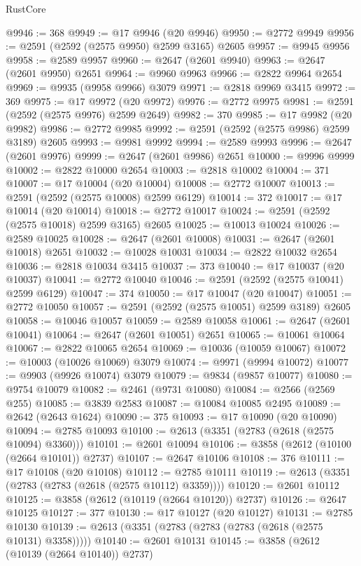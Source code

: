 \begin{lexlean}{RustCore}
\begin{coremodule}
@9946 := 368
@9949 := @17 @9946 (@20 @9946)
@9950 := @2772 @9949
@9956 := @2591 (@2592 (@2575 @9950) @2599 @3165) @2605
@9957 := @9945 @9956
@9958 := @2589 @9957
@9960 := @2647 (@2601 @9940)
@9963 := @2647 (@2601 @9950) @2651
@9964 := @9960 @9963
@9966 := @2822 @9964 @2654
@9969 := @9935 (@9958 @9966) @3079
@9971 := @2818 @9969 @3415
@9972 := 369
@9975 := @17 @9972 (@20 @9972)
@9976 := @2772 @9975
@9981 := @2591 (@2592 (@2575 @9976) @2599 @2649)
@9982 := 370
@9985 := @17 @9982 (@20 @9982)
@9986 := @2772 @9985
@9992 := @2591 (@2592 (@2575 @9986) @2599 @3189) @2605
@9993 := @9981 @9992
@9994 := @2589 @9993
@9996 := @2647 (@2601 @9976)
@9999 := @2647 (@2601 @9986) @2651
@10000 := @9996 @9999
@10002 := @2822 @10000 @2654
@10003 := @2818 @10002
@10004 := 371
@10007 := @17 @10004 (@20 @10004)
@10008 := @2772 @10007
@10013 := @2591 (@2592 (@2575 @10008) @2599 @6129)
@10014 := 372
@10017 := @17 @10014 (@20 @10014)
@10018 := @2772 @10017
@10024 := @2591 (@2592 (@2575 @10018) @2599 @3165) @2605
@10025 := @10013 @10024
@10026 := @2589 @10025
@10028 := @2647 (@2601 @10008)
@10031 := @2647 (@2601 @10018) @2651
@10032 := @10028 @10031
@10034 := @2822 @10032 @2654
@10036 := @2818 @10034 @3415
@10037 := 373
@10040 := @17 @10037 (@20 @10037)
@10041 := @2772 @10040
@10046 := @2591 (@2592 (@2575 @10041) @2599 @6129)
@10047 := 374
@10050 := @17 @10047 (@20 @10047)
@10051 := @2772 @10050
@10057 := @2591 (@2592 (@2575 @10051) @2599 @3189) @2605
@10058 := @10046 @10057
@10059 := @2589 @10058
@10061 := @2647 (@2601 @10041)
@10064 := @2647 (@2601 @10051) @2651
@10065 := @10061 @10064
@10067 := @2822 @10065 @2654
@10069 := @10036 (@10059 @10067)
@10072 := @10003 (@10026 @10069) @3079
@10074 := @9971 (@9994 @10072)
@10077 := @9903 (@9926 @10074) @3079
@10079 := @9834 (@9857 @10077)
@10080 := @9754 @10079
@10082 := @2461 (@9731 @10080)
@10084 := @2566 (@2569 @255)
@10085 := @3839 @2583
@10087 := @10084 @10085 @2495
@10089 := @2642 (@2643 @1624)
@10090 := 375
@10093 := @17 @10090 (@20 @10090)
@10094 := @2785 @10093
@10100 := @2613 (@3351 (@2783 (@2618 (@2575 @10094) @3360)))
@10101 := @2601 @10094
@10106 := @3858 (@2612 (@10100 (@2664 @10101)) @2737)
@10107 := @2647 @10106
@10108 := 376
@10111 := @17 @10108 (@20 @10108)
@10112 := @2785 @10111
@10119 := @2613 (@3351 (@2783 (@2783 (@2618 (@2575 @10112) @3359))))
@10120 := @2601 @10112
@10125 := @3858 (@2612 (@10119 (@2664 @10120)) @2737)
@10126 := @2647 @10125
@10127 := 377
@10130 := @17 @10127 (@20 @10127)
@10131 := @2785 @10130
@10139 := @2613 (@3351 (@2783 (@2783 (@2783 (@2618 (@2575 @10131) @3358)))))
@10140 := @2601 @10131
@10145 := @3858 (@2612 (@10139 (@2664 @10140)) @2737)

\end{coremodule}
\end{lexlean}
